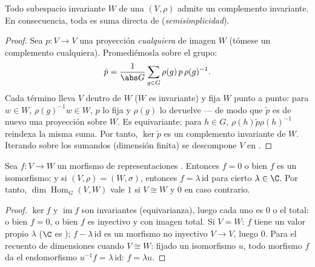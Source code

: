 \begin{theorem}[Maschke]\label{thm:b3:representations:maschke}
Todo subespacio invariante $W$ de una
 $(V, \rho)$ admite
un complemento invariante. En consecuencia, toda
 es suma directa de
(\emph{semisimplicidad}).
\end{theorem}

\begin{proof}
Sea $p \colon V \to V$ una proyección \emph{cualquiera} de imagen $W$
(tómese un complemento cualquiera). Promediémosla sobre el grupo:
\[
\tilde p = \frac1{\abs G}\sum_{g \in G} \rho(g)\,p\,\rho(g)^{-1}.
\]
Cada término lleva $V$ dentro de $W$ ($W$ es invariante) y fija $W$
punto a punto: para $w \in W$, $\rho(g)^{-1}w \in W$, $p$ lo fija y
$\rho(g)$ lo devuelve --- de modo que $\tilde p$ es de nuevo una
proyección sobre $W$. Es equivariante: para $h \in G$,
$\rho(h)\tilde p\rho(h)^{-1}$ reindexa la misma suma. Por tanto, $\ker
\tilde p$ es un complemento invariante de $W$. Iterando sobre los
sumandos (dimensión finita) se descompone $V$ en
.
\end{proof}

\begin{theorem}\label{thm:b3:representations:schur}
Sea $f \colon V \to W$ un morfismo de
representaciones
\emph{}. Entonces
$f = 0$ o bien $f$ es un isomorfismo; y si $(V,\rho) = (W,\sigma)$,
entonces $f = \lambda\,\mathrm{id}$ para cierto $\lambda \in \C$. Por
tanto, $\dim\operatorname{Hom}_G(V, W)$ vale $1$ si $V \cong W$ y $0$ en
caso contrario.
\end{theorem}

\begin{proof}
$\ker f$ y $\operatorname{im} f$ son invariantes (equivarianza), luego
cada uno es $0$ o el total: o bien $f = 0$, o bien $f$ es inyectivo y
con imagen total. Si $V = W$: $f$ tiene un valor propio $\lambda$ ($\C$
es );
$f - \lambda\,\mathrm{id}$ es un morfismo no inyectivo $V \to V$, luego
$0$. Para el recuento de dimensiones cuando $V \cong W$: fijado un
isomorfismo $u$, todo morfismo $f$ da el endomorfismo
$u^{-1}f = \lambda\,\mathrm{id}$: $f =
\lambda u$.
\end{proof}

